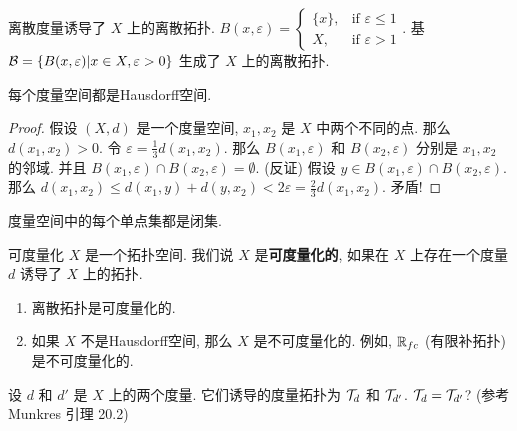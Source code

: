\begin{example}
    离散度量诱导了 $X$ 上的离散拓扑.
    $B(x,\varepsilon) = \begin{cases} \{x\}, & \text{if } \varepsilon\le 1 \\ X, & \text{if } \varepsilon > 1 \end{cases}$.
    基 $\mathcal{B}=\{B(x,\varepsilon)|x\in X, \varepsilon>0\}$ 生成了 $X$ 上的离散拓扑.
\end{example}

\begin{proposition}
    每个度量空间都是Hausdorff空间.
\end{proposition}
\begin{proof}
    假设 $(X,d)$ 是一个度量空间, $x_1,x_2$ 是 $X$ 中两个不同的点.
    那么 $d(x_1,x_2)>0$. 令 $\varepsilon = \frac{1}{3}d(x_1,x_2)$.
    那么 $B(x_1,\varepsilon)$ 和 $B(x_2,\varepsilon)$ 分别是 $x_1,x_2$ 的邻域.
    并且 $B(x_1,\varepsilon)\cap B(x_2,\varepsilon)=\emptyset$.
    (反证) 假设 $y\in B(x_1,\varepsilon)\cap B(x_2,\varepsilon)$.
    那么 $d(x_1,x_2)\le d(x_1,y)+d(y,x_2) < 2\varepsilon = \frac{2}{3}d(x_1,x_2)$. 矛盾!
\end{proof}

\begin{corollary}
    度量空间中的每个单点集都是闭集.
\end{corollary}

\begin{definition}{可度量化}
    $X$ 是一个拓扑空间. 我们说 $X$ 是\textbf{可度量化的}, 如果在 $X$ 上存在一个度量 $d$ 诱导了 $X$ 上的拓扑.
\end{definition}

\begin{instance}
    \begin{enumerate}
        \item 离散拓扑是可度量化的.
        \item 如果 $X$ 不是Hausdorff空间, 那么 $X$ 是不可度量化的. 例如, $\mathbb{R}_{fc}$ (有限补拓扑)是不可度量化的.
    \end{enumerate}
\end{instance}

\begin{question}
    设 $d$ 和 $d'$ 是 $X$ 上的两个度量. 它们诱导的度量拓扑为 $\mathcal{T}_d$ 和 $\mathcal{T}_{d'}$.
    $\mathcal{T}_d = \mathcal{T}_{d'}$? (参考 Munkres 引理 20.2)
\end{question}